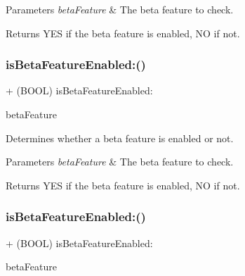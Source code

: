 \begin{DoxyParams}{Parameters}
{\em beta\+Feature} & The beta feature to check.\\
\hline
\end{DoxyParams}
\begin{DoxyReturn}{Returns}
Y\+ES if the beta feature is enabled, NO if not. 
\end{DoxyReturn}
\mbox{\label{interfaceFBSettings_a16d812cddbf44b8d354393d68757945f}} 
\subsubsection{\texorpdfstring{is\+Beta\+Feature\+Enabled\+:()}{isBetaFeatureEnabled:()}\hspace{0.1cm}{\footnotesize\ttfamily [2/5]}}
{\footnotesize\ttfamily + (B\+O\+OL) is\+Beta\+Feature\+Enabled\+: \begin{DoxyParamCaption}\item[{(F\+B\+Beta\+Features)}]{beta\+Feature }\end{DoxyParamCaption}}

Determines whether a beta feature is enabled or not.


\begin{DoxyParams}{Parameters}
{\em beta\+Feature} & The beta feature to check.\\
\hline
\end{DoxyParams}
\begin{DoxyReturn}{Returns}
Y\+ES if the beta feature is enabled, NO if not. 
\end{DoxyReturn}
\mbox{\label{interfaceFBSettings_a16d812cddbf44b8d354393d68757945f}} 
\subsubsection{\texorpdfstring{is\+Beta\+Feature\+Enabled\+:()}{isBetaFeatureEnabled:()}\hspace{0.1cm}{\footnotesize\ttfamily [3/5]}}
{\footnotesize\ttfamily + (B\+O\+OL) is\+Beta\+Feature\+Enabled\+: \begin{DoxyParamCaption}\item[{(F\+B\+Beta\+Features)}]{beta\+Feature }\end{DoxyParamCaption}}

